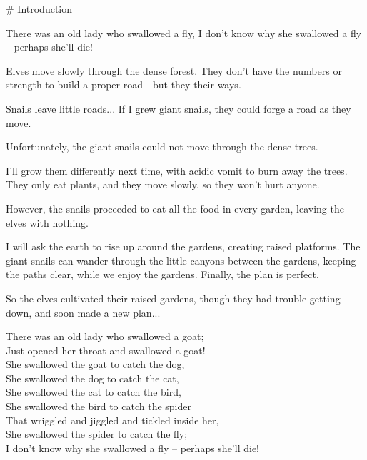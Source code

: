 # Introduction

\begin{exampletext}
  There was an old lady who swallowed a fly,
  I don't know why she swallowed a fly – perhaps she'll die!
\end{exampletext}

Elves move slowly through the dense forest.
They don't have the numbers or strength to build a proper road - but they their ways.

\begin{exampletext}
  Snails leave little roads...
  If I grew giant snails, they could forge a road as they move.
\end{exampletext}

Unfortunately, the giant snails could not move through the dense trees.

\begin{exampletext}
  I'll grow them differently next time, with acidic vomit to burn away the trees.
  They only eat plants, and they move slowly, so they won't hurt anyone.
\end{exampletext}

However, the snails proceeded to eat all the food in every garden, leaving the elves with nothing.

\begin{exampletext}
  I will ask the earth to rise up around the gardens, creating raised platforms.
  The giant snails can wander through the little canyons between the gardens, keeping the paths clear, while we enjoy the gardens.
  Finally, the plan is perfect.
\end{exampletext}

So the elves cultivated their raised gardens, though they had trouble getting down, and soon made a new plan...

\begin{exampletext}
  There was an old lady who swallowed a goat; \\
  Just opened her throat and swallowed a goat! \\
  She swallowed the goat to catch the dog, \\
  She swallowed the dog to catch the cat, \\
  She swallowed the cat to catch the bird, \\
  She swallowed the bird to catch the spider \\
  That wriggled and jiggled and tickled inside her, \\
  She swallowed the spider to catch the fly; \\
  I don't know why she swallowed a fly – perhaps she'll die! \\
\end{exampletext}

